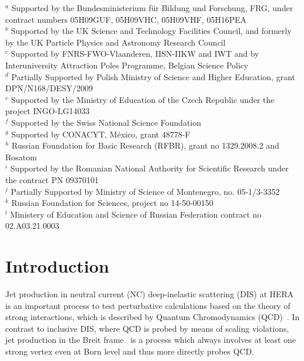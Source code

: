 \documentclass[12pt]{article}
\begin{document}
\begin{flushleft}
{\bigskip
 $ ^a$ Supported by the Bundesministerium f\"ur Bildung und Forschung, FRG,
      under contract numbers 05H09GUF, 05H09VHC, 05H09VHF,  05H16PEA \\
 $ ^b$ Supported by the UK Science and Technology Facilities Council,
      and formerly by the UK Particle Physics and
      Astronomy Research Council \\
 $ ^c$ Supported by FNRS-FWO-Vlaanderen, IISN-IIKW and IWT
      and by Interuniversity Attraction Poles Programme,
      Belgian Science Policy \\
 $ ^d$ Partially Supported by Polish Ministry of Science and Higher
      Education, grant  DPN/N168/DESY/2009 \\
 $ ^e$ Supported by the Ministry of Education of the Czech Republic
      under the project INGO-LG14033 \\
 $ ^f$ Supported by the Swiss National Science Foundation \\
 $ ^g$ Supported by  CONACYT,
      M\'exico, grant 48778-F \\
 $ ^h$ Russian Foundation for Basic Research (RFBR), grant no 1329.2008.2
      and Rosatom \\
 $ ^i$ Supported by the Romanian National Authority for Scientific Research
      under the contract PN 09370101 \\
 $ ^j$ Partially Supported by Ministry of Science of Montenegro,
      no. 05-1/3-3352 \\
 $ ^k$ Russian Foundation for Sciences,
      project no 14-50-00150 \\
 $ ^l$ Ministery of Education and Science of Russian Federation
      contract no 02.A03.21.0003 \\
}
\end{flushleft}
%


\clearpage


\section{Introduction}
Jet production in neutral current (NC) deep-inelastic scattering (DIS)
at HERA is an important process to test 
perturbative calculations based on 
the theory of strong interactions,
which is described by Quantum Chromodynamics (QCD)~\cite{QCD0,QCD1,QCD2,QCD3,QCD4}. 
In contrast to inclusive DIS,
where QCD is probed by means of scaling violations,
jet production in the Breit frame~\cite{feynman,breit}
is a process which always involves at least one strong vertex even at
Born level and thus more directly probes QCD. 
\end{document}
